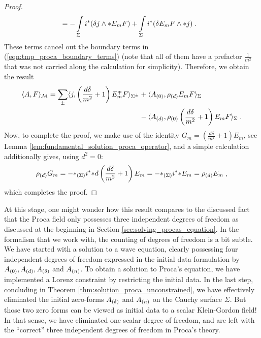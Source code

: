 \begin{proof}
\begin{align}
  &=-\int\limits_{\Sigma}  i^* {\left( \delta  j \wedge {*E_m F } \right) }  +  \int\limits_{\Sigma}  i^* {\left( \delta  E_m F \wedge  {*  j}   \right) }\;.
\end{align}
These terms cancel out the boundary terms in (\ref{eqn:tmp_proca_boundary_terms}) (note that all of them have a prefactor $\frac{1}{m^2}$ that was not carried along the calculation for simplicity). Therefore, we obtain the result
 \begin{align}
  \langle A, F \rangle_{\mathcal{M}} = \sum\limits_\pm \langle j , \left( \frac{d \delta}{m^2} +1 \right) E_m^\mp F   \rangle_{\Sigma^\pm}
  &+ \langle {A_{(0)}} , \rho_{(d)} E_m F \rangle_\Sigma \notag \\
  &- \langle {A_{(d)}} , \rho_{(0)} \left( \frac{d \delta}{m^2} +1 \right) E_m F \rangle_\Sigma \;.
 \end{align}
 Now, to complete the proof, we make use of the identity $G_m = \left( \frac{d \delta}{m^2} +1 \right) E_m$, see Lemma \ref{lem:fundamental_solution_proca_operator}, and a simple calculation additionally gives, using $d^2 =0$:
 \begin{align}
 \rho_{(d)} G_m = - {*_{(\Sigma)} {i^* *}} d\left( \frac{d \delta}{m^2} +1 \right) E_m = - {*_{(\Sigma)}{i^* *}} E_m = \rho_{(d)} E_m \;,
 \end{align}
 which completes the proof.
\end{proof}
At this stage, one might wonder how this result compares to the discussed fact that the Proca field only possesses three independent degrees of freedom as discussed at the beginning in Section \ref{sec:solving_procas_equation}. In the formalism that we work with, the counting of degrees of freedom is a bit subtle. We have started with a solution to a wave equation, clearly possessing four independent degrees of freedom expressed in the initial data formulation by ${A_{(0)}}, {A_{(d)}}, {A_{(\delta)}}$ and ${A_{(n)}}$. To obtain a solution to Proca's equation, we have implemented a Lorenz constraint by restricting the initial data. In the last step, concluding in Theorem \ref{thm:solution_proca_unconstrained}, we have effectively eliminated the initial zero-forms ${A_{(\delta)}}$ and ${A_{(n)}}$ on the Cauchy surface $\Sigma$. But those two zero forms can be viewed as initial data to a scalar Klein-Gordon field! In that sense, we have eliminated one scalar degree of freedom, and are left with the ``correct'' three independent degrees of freedom in Proca's theory.
%
%
